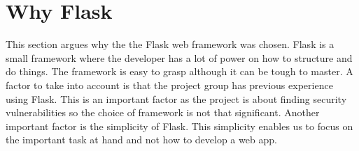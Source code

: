 \section{Why Flask}
This section argues why the the Flask web framework was chosen.
Flask is a small framework where the developer has a lot of power on how to structure and do things.
The framework is easy to grasp although it can be tough to master.
A factor to take into account is that the project group has previous experience using Flask.
This is an important factor as the project is about finding security vulnerabilities so the choice of framework is not that significant.
Another important factor is the simplicity of Flask.
This simplicity enables us to focus on the important task at hand and not how to develop a web app.
